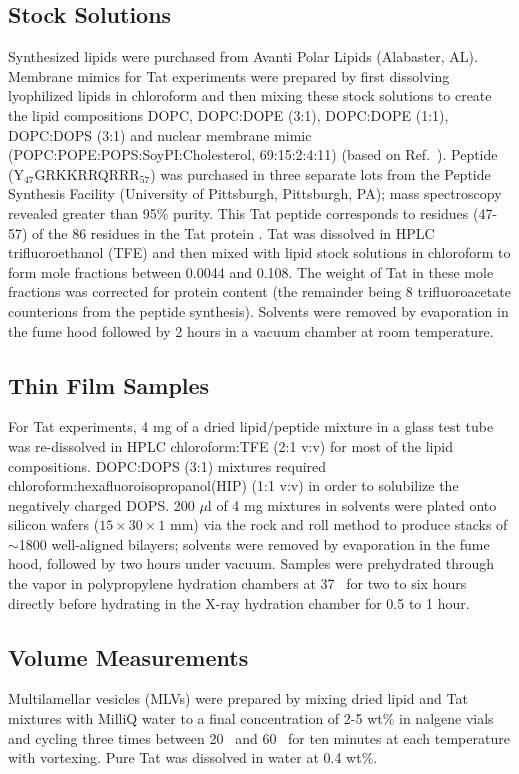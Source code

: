 \subsection{Stock Solutions}
Synthesized lipids were purchased from Avanti Polar Lipids (Alabaster, AL). 
Membrane mimics for Tat experiments were prepared by first 
dissolving lyophilized lipids in chloroform and then mixing these stock 
solutions to create the lipid compositions
DOPC, DOPC:DOPE (3:1), DOPC:DOPE (1:1), DOPC:DOPS (3:1) and nuclear membrane
mimic (POPC:POPE:POPS:SoyPI:Cholesterol, 69:15:2:4:11) (based on Ref.~\cite{Jarasch73}). 
Peptide (Y$_{47}$GRKKRRQRRR$_{57}$) was purchased in three separate lots from the 
Peptide Synthesis Facility (University of Pittsburgh, Pittsburgh, PA); 
mass spectroscopy revealed greater than 95\% purity. 
This Tat peptide corresponds to residues (47-57) of the 86 residues in the Tat 
protein \cite{Vives97}. 
Tat was dissolved in HPLC trifluoroethanol (\acs{TFE}) and then mixed with lipid 
stock solutions in chloroform to form mole fractions between 0.0044 and 0.108. 
The weight of Tat in these mole fractions was corrected for protein content 
(the remainder being 8 trifluoroacetate counterions from the peptide synthesis). 
Solvents were removed by evaporation in the fume hood followed
by 2 hours in a vacuum chamber at room temperature.

\subsection{Thin Film Samples}
For Tat experiments, 4 mg of a dried lipid/peptide mixture 
in a glass test tube was re-dissolved 
in HPLC chloroform:TFE (2:1 v:v) for most of the lipid compositions. 
DOPC:DOPS (3:1) mixtures required chloroform:hexafluoroisopropanol(\acs{HIP}) (1:1 v:v) in order to 
solubilize the negatively charged DOPS. 200 $\mu$l of 4 mg mixtures in 
solvents were plated onto silicon wafers ($15\times 30\times 1$ mm) via 
the rock and roll method \cite{Tristram-Nagle07_MMB} 
to produce stacks of $\sim$1800 well-aligned 
bilayers; solvents were removed by evaporation in the fume hood, followed by 
two hours under vacuum. Samples were prehydrated through the
vapor in polypropylene hydration chambers at 37 \textcelsius\ for two to six 
hours directly before hydrating in the X-ray hydration chamber 
\cite{Kucerka05_BPJ} for 0.5 to 1 hour. 

\subsection{Volume Measurements}\label{sec:volume_method}
Multilamellar vesicles (\acs{MLV}s) were prepared by mixing dried lipid and Tat mixtures with 
MilliQ water to a final concentration of 2-5 wt\% in nalgene vials and cycling 
three times between 20 \textcelsius\ and 60 \textcelsius\ for ten minutes at 
each temperature with vortexing. Pure Tat was dissolved in water at 0.4 wt\%.

